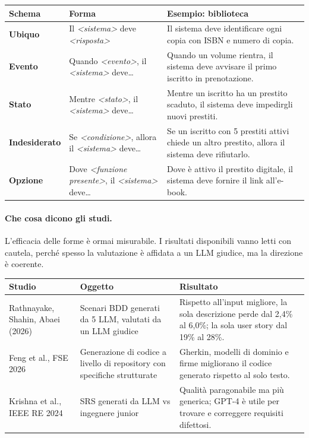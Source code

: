 \documentclass[12pt]{extarticle}
\begin{document}
\begin{center}
\small
\begin{tabular}{p{2.4cm}p{5.4cm}p{7.4cm}}
    \toprule
    \textbf{Schema} & \textbf{Forma} & \textbf{Esempio: biblioteca} \\
    \midrule
    \textbf{Ubiquo} & Il \textit{<sistema>} deve \textit{<risposta>} & Il sistema deve identificare ogni copia con ISBN e numero di copia. \\
    \addlinespace
    \textbf{Evento} & Quando \textit{<evento>}, il \textit{<sistema>} deve\ldots & Quando un volume rientra, il sistema deve avvisare il primo iscritto in prenotazione. \\
    \addlinespace
    \textbf{Stato} & Mentre \textit{<stato>}, il \textit{<sistema>} deve\ldots & Mentre un iscritto ha un prestito scaduto, il sistema deve impedirgli nuovi prestiti. \\
    \addlinespace
    \textbf{Indesiderato} & Se \textit{<condizione>}, allora il \textit{<sistema>} deve\ldots & Se un iscritto con 5 prestiti attivi chiede un altro prestito, allora il sistema deve rifiutarlo. \\
    \addlinespace
    \textbf{Opzione} & Dove \textit{<funzione presente>}, il \textit{<sistema>} deve\ldots & Dove è attivo il prestito digitale, il sistema deve fornire il link all'e-book. \\
    \bottomrule
\end{tabular}
\end{center}

\paragraph{Che cosa dicono gli studi.}
L'efficacia delle forme è ormai misurabile. I risultati disponibili vanno letti con cautela, perché spesso la valutazione è affidata a un LLM giudice, ma la direzione è coerente.

\begin{center}
\small
\begin{tabular}{p{4.2cm}p{6.0cm}p{5.0cm}}
    \toprule
    \textbf{Studio} & \textbf{Oggetto} & \textbf{Risultato} \\
    \midrule
    Rathnayake, Shahin, Abaei (2026) & Scenari BDD generati da 5 LLM, valutati da un LLM giudice & Rispetto all'input migliore, la sola descrizione perde dal 2,4\% al 6,0\%; la sola user story dal 19\% al 28\%. \\
    \addlinespace
    Feng et al., FSE 2026 & Generazione di codice a livello di repository con specifiche strutturate & Gherkin, modelli di dominio e firme migliorano il codice generato rispetto al solo testo. \\
    \addlinespace
    Krishna et al., IEEE RE 2024 & SRS generati da LLM vs ingegnere junior & Qualità paragonabile ma più generica; GPT-4 è utile per trovare e correggere requisiti difettosi. \\
    \bottomrule
\end{tabular}
\end{center}
\end{document}
